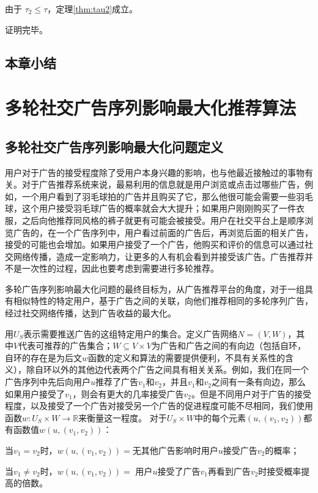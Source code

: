 由于 $\tau_2 \le \tau$，定理\ref{thm:tau2}成立。

证明完毕。


\section{本章小结}


\chapter{多轮社交广告序列影响最大化推荐算法}

\section{多轮社交广告序列影响最大化问题定义}
\label{sec:def}
用户对于广告的接受程度除了受用户本身兴趣的影响，也与他最近接触过的事物有关。对于广告推荐系统来说，最易利用的信息就是用户浏览或点击过哪些广告，例如，一个用户看到了羽毛球拍的广告并且购买了它，那么他很可能会需要一些羽毛球，这个用户接受羽毛球广告的概率就会大大提升；如果用户刚刚购买了一件衣服，之后向他推荐同风格的裤子就更有可能会被接受。用户在社交平台上是顺序浏览广告的，在一个广告序列中，用户看过前面的广告后，再浏览后面的相关广告，接受的可能也会增加。如果用户接受了一个广告，他购买和评价的信息可以通过社交网络传播，造成一定影响力，让更多的人有机会看到并接受该广告。广告推荐并不是一次性的过程，因此也要考虑到需要进行多轮推荐。

多轮广告序列影响最大化问题的最终目标为，从广告推荐平台的角度，对于一组具有相似特性的特定用户，基于广告之间的关联，向他们推荐相同的多轮序列广告，经过社交网络传播，达到广告收益的最大化。

用$U_S$表示需要推送广告的这组特定用户的集合。定义广告网络$N=(V,W)$，其中$V$代表可推荐的广告集合；$W\subseteq V \times V$为广告和广告之间的有向边（包括自环，自环的存在是为后文$w$函数的定义和算法的需要提供便利，不具有关系性的含义），除自环以外的其他边代表两个广告之间具有相关关系。例如，我们在同一个广告序列中先后向用户$u$推荐了广告$v_1$和$v_2$，并且$v_1$和$v_2$之间有一条有向边，那么如果用户接受了$v_1$，则会有更大的几率接受广告$v_2$。但是不同用户对于广告的接受程度，以及接受了一个广告对接受另一个广告的促进程度可能不尽相同，我们使用函数$w:U_S \times W \to \mathbb{R}$来衡量这一程度。 对于$U_S \times W$中的每个元素$(u,(v_1,v_2))$都有函数值$w(u,(v_1,v_2))$：

当$v_1=v_2$时，$w(u,(v_1,v_2))=$无其他广告影响时用户$u$接受广告$v_2$的概率；

当$v_1\ne v_2$时，$w(u,(v_1,v_2))=$ 用户$u$接受了广告$v_1$再看到广告$v_2$时接受概率提高的倍数。


